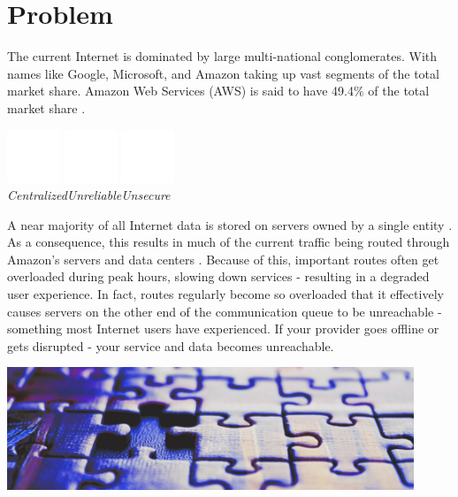 \documentclass{article}
\begin{document}
\newpage
\section{Problem}
The current Internet is dominated by large multi-national conglomerates. With names like Google, Microsoft, and Amazon taking up vast segments of the total market share. Amazon Web Services (AWS) is said to have 49.4\% of the total market share \cite{jeb2019}.

\begin{center}
\includegraphics[width=45pt]{centralized}
\hspace{1.5cm}
\includegraphics[width=45pt]{unreliable}
\hspace{1.5cm}
\includegraphics[width=45pt]{unsecure}
\\
\vspace{0.1cm}
\hspace{0pt}\emph{Centralized}\hspace{50pt}\emph{Unreliable}\hspace{54pt}\emph{Unsecure}\hspace{24pt}
\end{center}

\noindent A near majority of all Internet data is stored on servers owned by a single entity \cite{jeb2019}. As a consequence, this results in much of the current traffic being routed through Amazon’s servers and data centers \cite{jeb2019}. Because of this, important routes often get overloaded during peak hours, slowing down services - resulting in a degraded user experience. In fact, routes regularly become so overloaded that it effectively causes servers on the other end of the communication queue to be unreachable - something most Internet users have experienced. If your provider goes offline or gets disrupted - your service and data becomes unreachable.

\begin{mdframed}[style=textimage]
	\includegraphics[width=345pt]{puzzle}
\end{mdframed}
\end{document}
